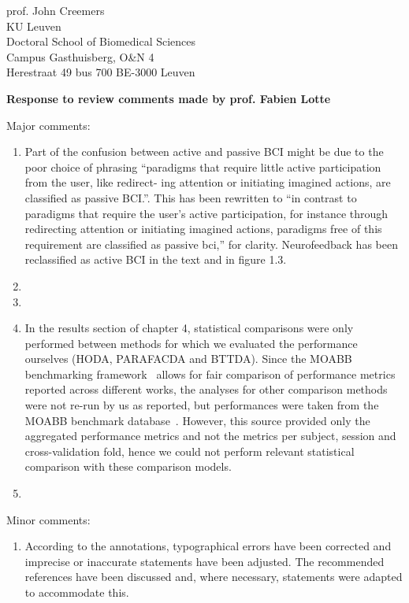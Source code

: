 \documentclass{letter}
\newcommand{\reply}[1]{%
	\textbf{Response to review comments made by prof. #1}

}
\begin{document}
\begin{letter}{
	prof. John Creemers \\
	KU Leuven \\
	Doctoral School of Biomedical Sciences \\
	Campus Gasthuisberg, O\&N 4 \\
	Herestraat 49 bus 700
	BE-3000 Leuven

}
\reply{Fabien Lotte}
Major comments:
\begin{enumerate}
	\item Part of the confusion between active and passive BCI might be due
	to the poor choice of phrasing ``paradigms that require little active participation from the user, like redirect-
	ing attention or initiating imagined actions, are classified as passive BCI.''.
	This has been rewritten to ``in contrast to paradigms that require the user's active participation, for
	instance through redirecting attention or initiating imagined actions,
	paradigms free of this requirement are classified as passive bci,''
	for clarity.
	Neurofeedback has been reclassified as active BCI in the text and in
	figure 1.3.
	\item {}
	\item {}
	\item In the results section of chapter 4, statistical comparisons were
	only performed between methods for which we evaluated the performance
	ourselves (HODA, PARAFACDA and BTTDA).
	Since the MOABB benchmarking framework~\cite{Aristimunha2023} allows for
	fair comparison of performance metrics reported across different works,
	the analyses for other comparison methods were not re-run
	by us as reported, but performances were
	taken from the MOABB benchmark database~\cite{Chevallier2024}.
	However, this source provided only the aggregated performance metrics
	and not the metrics per subject, session and cross-validation fold,
	hence we could not perform relevant statistical comparison with these
	comparison models.
	\item {}
\end{enumerate}
Minor comments:
\begin{enumerate}
	\item According to the annotations, typographical errors have been
	corrected and imprecise or inaccurate statements have been adjusted.
	The recommended references have been discussed and, where necessary,
	statements were adapted to accommodate this.
\end{enumerate}


\end{letter}
\end{document}

